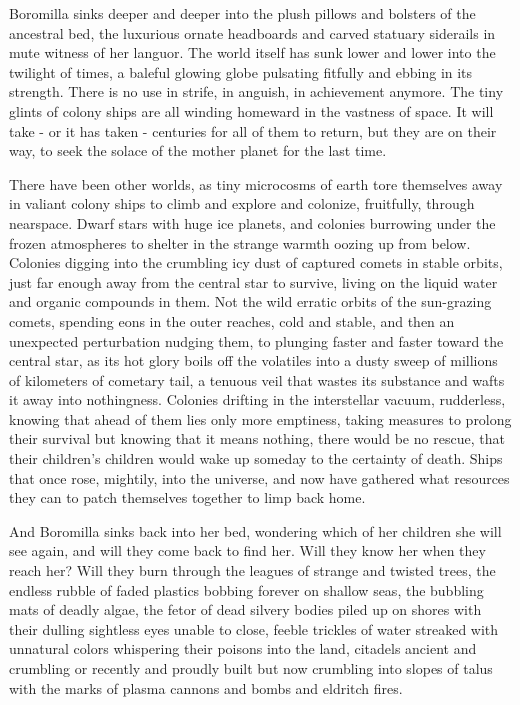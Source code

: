 Boromilla sinks deeper and deeper into the plush pillows and bolsters of
the ancestral bed, the luxurious ornate headboards and carved statuary
siderails in mute witness of her languor. The world itself has sunk
lower and lower into the twilight of times, a baleful glowing globe
pulsating fitfully and ebbing in its strength. There is no use in
strife, in anguish, in achievement anymore. The tiny glints of colony
ships are all winding homeward in the vastness of space. It will take -
or it has taken - centuries for all of them to return, but they are on
their way, to seek the solace of the mother planet for the last time.

There have been other worlds, as tiny microcosms of earth tore
themselves away in valiant colony ships to climb and explore and
colonize, fruitfully, through nearspace. Dwarf stars with huge ice
planets, and colonies burrowing under the frozen atmospheres to shelter
in the strange warmth oozing up from below. Colonies digging into the
crumbling icy dust of captured comets in stable orbits, just far enough
away from the central star to survive, living on the liquid water and
organic compounds in them. Not the wild erratic orbits of the
sun-grazing comets, spending eons in the outer reaches, cold and stable,
and then an unexpected perturbation nudging them, to plunging faster and
faster toward the central star, as its hot glory boils off the volatiles
into a dusty sweep of millions of kilometers of cometary tail, a tenuous
veil that wastes its substance and wafts it away into nothingness.
Colonies drifting in the interstellar vacuum, rudderless, knowing that
ahead of them lies only more emptiness, taking measures to prolong their
survival but knowing that it means nothing, there would be no rescue,
that their children's children would wake up someday to the certainty of
death. Ships that once rose, mightily, into the universe, and now have
gathered what resources they can to patch themselves together to limp
back home.

And Boromilla sinks back into her bed, wondering which of her children
she will see again, and will they come back to find her. Will they know
her when they reach her? Will they burn through the leagues of strange
and twisted trees, the endless rubble of faded plastics bobbing forever
on shallow seas, the bubbling mats of deadly algae, the fetor of dead
silvery bodies piled up on shores with their dulling sightless eyes
unable to close, feeble trickles of water streaked with unnatural colors
whispering their poisons into the land, citadels ancient and crumbling
or recently and proudly built but now crumbling into slopes of talus
with the marks of plasma cannons and bombs and eldritch fires.

